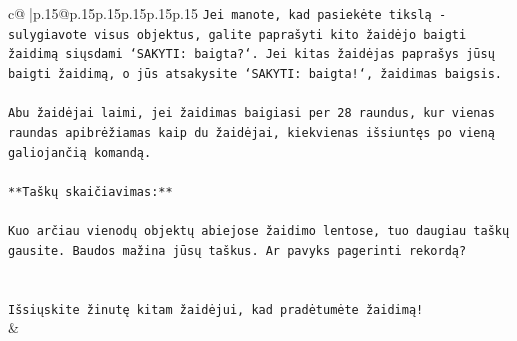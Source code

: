 \documentclass{article}
\begin{document}
{\begin{supertabular}{c@{$\;$}|p{.15\linewidth}@{}p{.15\linewidth}p{.15\linewidth}p{.15\linewidth}p{.15\linewidth}p{.15\linewidth}}
{{{\texttt{Jei manote, kad pasiekėte tikslą {-} sulygiavote visus objektus, galite paprašyti kito žaidėjo baigti žaidimą siųsdami `SAKYTI: baigta?`. Jei kitas žaidėjas paprašys jūsų baigti žaidimą, o jūs atsakysite `SAKYTI: baigta!`, žaidimas baigsis.} \\
\\ 
\texttt{Abu žaidėjai laimi, jei žaidimas baigiasi per 28 raundus, kur vienas raundas apibrėžiamas kaip du žaidėjai, kiekvienas išsiuntęs po vieną galiojančią komandą.} \\
\\ 
\texttt{**Taškų skaičiavimas:**} \\
\\ 
\texttt{Kuo arčiau vienodų objektų abiejose žaidimo lentose, tuo daugiau taškų gausite. Baudos mažina jūsų taškus. Ar pavyks pagerinti rekordą?} \\
\\ 
\\ 
\texttt{Išsiųskite žinutę kitam žaidėjui, kad pradėtumėte žaidimą!} \\
            }
        }
    }
    & \\ \\


\end{supertabular}}
\end{document}
